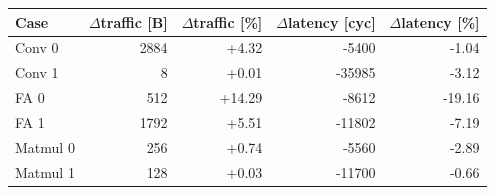\begin{tabular}{lrrrr}
\toprule
Case & $\Delta$traffic [B] & $\Delta$traffic [\%] & $\Delta$latency [cyc] & $\Delta$latency [\%] \\
\midrule
Conv 0 & 2884 & +4.32 & -5400 & -1.04 \\
Conv 1 & 8 & +0.01 & -35985 & -3.12 \\
FA 0 & 512 & +14.29 & -8612 & -19.16 \\
FA 1 & 1792 & +5.51 & -11802 & -7.19 \\
Matmul 0 & 256 & +0.74 & -5560 & -2.89 \\
Matmul 1 & 128 & +0.03 & -11700 & -0.66 \\
\bottomrule
\end{tabular}
